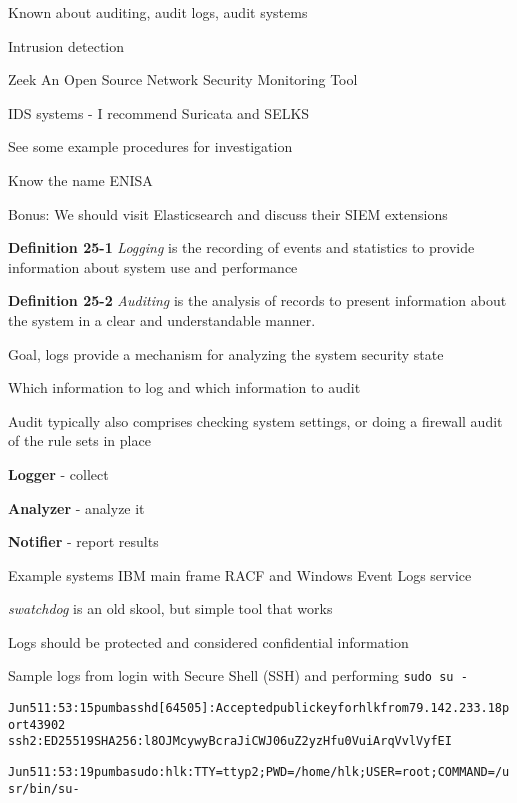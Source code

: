 \documentclass[Screen16to9,17pt]{foils}
\begin{document}


\begin{list2}
\item Known about auditing, audit logs, audit systems
\item Intrusion detection
\item Zeek An Open Source Network Security Monitoring Tool
\item IDS systems - I recommend Suricata and SELKS
\item See some example procedures for investigation
\item Know the name ENISA
\end{list2}

Bonus: We should visit Elasticsearch and discuss their SIEM extensions


\begin{list1}
\item {\bf Definition 25-1} \emph{Logging} is the recording of events and statistics to provide information about system use and performance
\item {\bf Definition 25-2} \emph{Auditing} is the analysis of records to present information about the system in a clear and understandable manner.
\item Goal, logs provide a mechanism for analyzing the system security state
\item Which information to log and which information to audit
\item Audit typically also comprises checking system settings, or doing a firewall audit of the rule sets in place
\end{list1}


\begin{list1}
\item {\bf Logger} - collect
\item {\bf Analyzer} - analyze it
\item {\bf Notifier} - report results
\item Example systems IBM main frame RACF and Windows Event Logs service
\item \emph{swatchdog} is an old skool, but simple tool that works
\item Logs should be protected and considered confidential information
\end{list1}

Sample logs from login with Secure Shell (SSH) and performing \verb+sudo su -+
\begin{alltt}\footnotesize
Jun  5 11:53:15 pumba sshd[64505]: Accepted publickey for hlk from 79.142.233.18 port 43902
 ssh2: ED25519 SHA256:l8OJMcywyBcraJiCWJ06uZ2yzHfu0VuiArqVvlVyfEI

Jun  5 11:53:19 pumba sudo:      hlk : TTY=ttyp2 ; PWD=/home/hlk ; USER=root ; COMMAND=/usr/bin/su -
\end{alltt}
\end{document}
